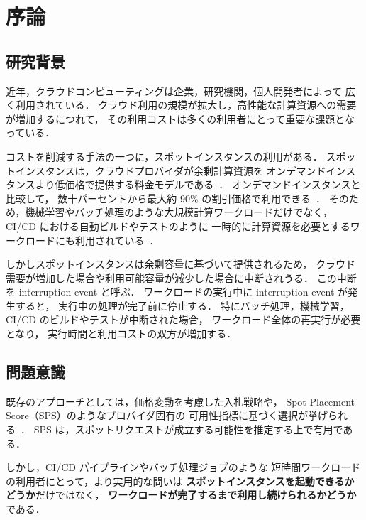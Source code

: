 \documentclass[11pt,a4paper]{ltjsreport}
\begin{document}
\tableofcontents
\listoffigures
\listoftables

\chapter{序論}

\section{研究背景}

近年，クラウドコンピューティングは企業，研究機関，個人開発者によって
広く利用されている．
クラウド利用の規模が拡大し，高性能な計算資源への需要が増加するにつれて，
その利用コストは多くの利用者にとって重要な課題となっている．

コストを削減する手法の一つに，スポットインスタンスの利用がある．
スポットインスタンスは，クラウドプロバイダが余剰計算資源を
オンデマンドインスタンスより低価格で提供する料金モデルである~\cite{AWSSpot}．
オンデマンドインスタンスと比較して，
数十パーセントから最大約 90\% の割引価格で利用できる~\cite{Lin2022Survey}．
そのため，機械学習やバッチ処理のような大規模計算ワークロードだけでなく，
CI/CD における自動ビルドやテストのように
一時的に計算資源を必要とするワークロードにも利用されている~\cite{Ramesh2025}．

しかしスポットインスタンスは余剰容量に基づいて提供されるため，
クラウド需要が増加した場合や利用可能容量が減少した場合に中断されうる．
この中断を interruption event と呼ぶ．
ワークロードの実行中に interruption event が発生すると，
実行中の処理が完了前に停止する．
特にバッチ処理，機械学習，CI/CD のビルドやテストが中断された場合，
ワークロード全体の再実行が必要となり，
実行時間と利用コストの双方が増加する．

\section{問題意識}

既存のアプローチとしては，価格変動を考慮した入札戦略や，
Spot Placement Score（SPS）のようなプロバイダ固有の
可用性指標に基づく選択が挙げられる~\cite{Garg2025,Katayama2022}．
SPS は，スポットリクエストが成立する可能性を推定する上で有用である．

しかし，CI/CD パイプラインやバッチ処理ジョブのような
短時間ワークロードの利用者にとって，より実用的な問いは
\textbf{スポットインスタンスを起動できるかどうか}だけではなく，
\textbf{ワークロードが完了するまで利用し続けられるかどうか}である．
\end{document}
